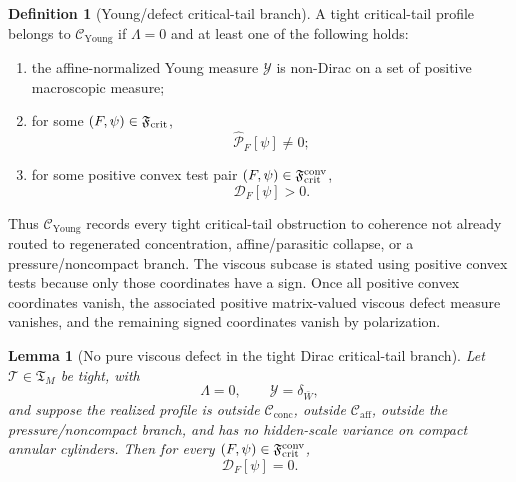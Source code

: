 \documentclass[11pt]{amsart}
\numberwithin{equation}{section}
\theoremstyle{plain}
\newtheorem{lemma}[lemma]{Lemma}
\theoremstyle{definition}
\newtheorem{definition}[definition]{Definition}
\theoremstyle{remark}
\newcommand{\Cactive}{\mathcal C_{\mathrm{conc}}}
\newcommand{\Caff}{\mathcal C_{\mathrm{aff}}}
\newcommand{\Tcrit}{\mathfrak T_M}
\newcommand{\Cyoung}{\mathcal C_{\mathrm{Young}}}
\begin{document}
\begin{definition}[Young/defect critical-tail branch]
\label{def:young-defect-critical-tail-branch}
A tight critical-tail profile belongs to \(\Cyoung\) if \(\Lambda=0\) and at
least one of the following holds:
\begin{enumerate}[label=\textup{(\roman*)}]
   \item the affine-normalized Young measure \(\mathcal Y\) is non-Dirac on a set
   of positive macroscopic measure;
   \item for some \((F,\psi)\in\mathfrak F_{\rm crit}\),
   \[
      \widehat{\mathscr P}_F[\psi]\ne0;
   \]
   \item for some positive convex test pair
   \((F,\psi)\in\mathfrak F_{\rm crit}^{\rm conv}\),
   \[
      \mathscr D_F[\psi]>0.
   \]
\end{enumerate}
Thus \(\Cyoung\) records every tight critical-tail obstruction to coherence not
already routed to regenerated concentration, affine/parasitic collapse, or a
pressure/noncompact branch.  The viscous subcase is stated using positive convex
tests because only those coordinates have a sign.  Once all positive convex
coordinates vanish, the associated positive matrix-valued viscous defect measure
vanishes, and the remaining signed coordinates vanish by polarization.
\end{definition}

\begin{lemma}[No pure viscous defect in the tight Dirac critical-tail branch]
\label{lem:no-pure-viscous-defect-tight-dirac}
Let \(\mathcal T\in\Tcrit\) be tight, with
\[
   \Lambda=0,
   \qquad
   \mathcal Y=\delta_{\bar W},
\]
and suppose the realized profile is outside \(\Cactive\), outside \(\Caff\),
outside the pressure/noncompact branch, and has no hidden-scale variance on
compact annular cylinders.  Then for every
\((F,\psi)\in\mathfrak F_{\rm crit}^{\rm conv}\),
\[
   \mathscr D_F[\psi]=0 .
\]
\end{lemma}
\end{document}
